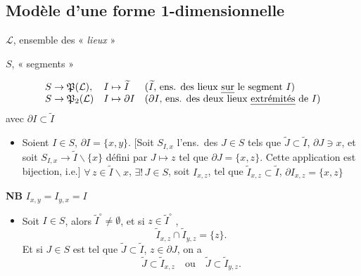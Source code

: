\documentclass[11pt,a4paper]{article}
\begin{document}
\subsection{Modèle d'une forme 1-dimensionnelle}

$\mathcal{L}$, ensemble des « \emph{lieux} »

$S$,  « segments »

\[
  \begin{array}{lll}
    S \to \mathfrak{P}(\mathcal{L}), & I \mapsto \widetilde{I} & (\widetilde{I}\text{, ens. des lieux \emph{sur} le segment } I) \\
    S \to \mathfrak{P}_2(\mathcal{L}) & I \mapsto \partial I & (\partial I\text{, ens. des deux lieux \emph{extrémités} de } I)
  \end{array}
\]
avec $\partial I \subset \widetilde{I}$

\begin{itemize}
  \item[F1)] Soient $I \in S$, $\partial I = \{x,y\}$.  [Soit $S_{I,x}$ l'ens.\ des $J \in S$ tels que $\widetilde{J} \subset \widetilde{I}$, $\partial J \ni x$, et soit $S_{I,x} \to \widetilde{I} \smallsetminus \{x\}$ défini par $J \mapsto z$ tel que $\partial J = \{x,z\}$. Cette application est bijection, i.e.] $\forall\, z \in \widetilde{I} \smallsetminus x$, $\exists !\, J \in S$, \struck{\ill{}} soit $I_{x,z}$, tel que $\widetilde{I}_{x,z} \subset \widetilde{I}$, $\partial I_{x,z} = \{x,z\}$
\end{itemize}

\textbf{NB} $I_{x,y} = I_{y,x} = I$


\begin{itemize}
  \item[F2)] Soit $I \in S$, alors  $\widetilde{I}^{\circ} \neq \emptyset$, et si $z \in \widetilde{I}^{\circ}$ ,
  \[
    \widetilde{I}_{x,z} \cap \widetilde{I}_{y,z} = \{z\}.
  \]
  Et si $J \in S$ est tel que $\widetilde{J} \subset \widetilde{I}$, $z \in \partial J$, on a
  \[
    \widetilde{J} \subset \widetilde{I}_{x,z} \quad\text{ou}\quad \widetilde{J} \subset \widetilde{I}_{y,z}.
  \]
\end{itemize}
\end{document}
